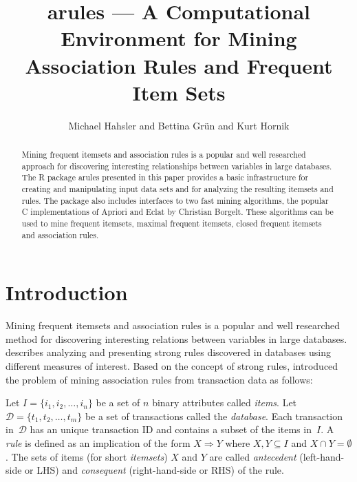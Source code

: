\documentclass[10pt,a4paper]{article}
\newcommand{\strong}[1]{{\normalfont\fontseries{b}\selectfont #1}}
\newcommand{\pkg}[1]{\strong{#1}}
\newcommand{\proglang}[1]{\textsf{#1}}
\newcommand{\set}[1]{\mathcal{#1}}
\begin{document}
\title{\pkg{arules} ---  A Computational Environment for Mining 
    Association Rules and Frequent Item Sets}
\author{Michael Hahsler and Bettina Gr{\"u}n and Kurt Hornik}
\maketitle
\sloppy
\begin{abstract}
  Mining frequent itemsets and association rules is a popular and well
  researched approach for discovering interesting relationships between
  variables in large databases.  The \proglang{R} package \pkg{arules}
  presented in this paper provides a basic infrastructure for creating
  and manipulating input data sets and for analyzing the resulting
  itemsets and rules.  The package also includes interfaces to two fast
  mining algorithms, the popular \proglang{C} implementations of Apriori
  and Eclat by Christian Borgelt.  These algorithms can be used to mine
  frequent itemsets, maximal frequent itemsets, closed frequent itemsets
  and association rules.
\end{abstract}


\section{Introduction}

Mining frequent itemsets and association rules is a popular and well
researched method for discovering interesting relations between
variables in large databases. \cite{arules:Piatetsky-Shapiro:1991}
describes analyzing and presenting strong rules discovered in databases
using different measures of interest.  Based on the concept of strong
rules, \cite{arules:Agrawal+Imielinski+Swami:1993} introduced the
problem of mining association rules from transaction data as follows:

Let $I=\{i_1, i_2,\ldots,i_n\}$ be a set of $n$ binary attributes called
\emph{items}.  Let $\set{D} = \{t_1, t_2, \ldots, t_m\}$ be a set of
transactions called the \emph{database}.  Each transaction
in~$\set{D}$ has an unique transaction ID and
contains a subset of the items in~$I$.
A \emph{rule} is defined as an implication of the form $X \Rightarrow Y$
where $X, Y \subseteq I$ and $X \cap Y = \emptyset$.  The sets of items
(for short \emph{itemsets}) $X$ and $Y$ are called \emph{antecedent}
(left-hand-side or LHS) and \emph{consequent} (right-hand-side or RHS)
of the rule.
\end{document}
